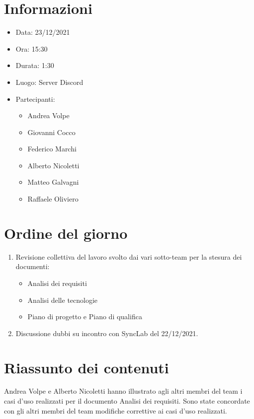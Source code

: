 \documentclass[a4paper, 12pt]{article}
\begin{document}
\makefrontpage

\section{Informazioni}

\begin{itemize}
\item Data: 23/12/2021
\item Ora: 15:30
\item Durata: 1:30
\item Luogo: Server Discord
\item Partecipanti: 
\begin{itemize}
\item Andrea Volpe
\item Giovanni Cocco
\item Federico Marchi
\item Alberto Nicoletti
\item Matteo Galvagni
\item Raffaele Oliviero
\end{itemize}
\end{itemize}

\section{Ordine del giorno}
\begin{enumerate}
\item Revisione collettiva del lavoro svolto dai vari sotto-team per la stesura dei documenti:
\begin{itemize}
\item Analisi dei requisiti
\item Analisi delle tecnologie
\item Piano di progetto e Piano di qualifica
\end{itemize}
\item Discussione dubbi su incontro con SyncLab del 22/12/2021.
\end{enumerate}

\section{Riassunto dei contenuti}
Andrea Volpe e Alberto Nicoletti hanno illustrato agli altri membri del team i casi d'uso realizzati per il documento Analisi dei requisiti.
Sono state concordate con gli altri membri del team modifiche correttive ai casi d'uso realizzati.
\end{document}
